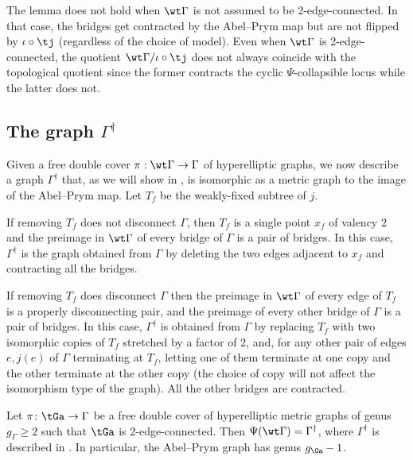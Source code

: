 \begin{rema}
The lemma does not hold when $\wt\Gamma$ is not assumed to be 2-edge-connected. In that case, the bridges get contracted by the Abel--Prym map but are not flipped by $\iota\circ\tj$ (regardless of the choice of model).  
Even when $\wt\Gamma$ is 2-edge-connected, the quotient $\wt\Gamma/\iota\circ\tj$ does not always coincide with the topological quotient since the former contracts the cyclic $\Psi$-collapsible locus while the latter does not. 
\end{rema}

\subsection{The graph \texorpdfstring{$\Gamma^{\dagger}$}{Gamma\textdagger}}\label{GammaDagger}
Given a free double cover $\pi:\wt\Gamma\to\Gamma$ of hyperelliptic graphs, we now describe a graph $\Gamma^{\dagger}$ that, as we will show in , is isomorphic as a metric graph to the image of the Abel--Prym map. 
Let $T_f$ be the weakly-fixed subtree of $j$. 

If removing $T_f$ does not disconnect $\Gamma$, then $T_f$ is a single point $x_f$ of valency 2 and the preimage in $\wt\Gamma$ of every bridge of $\Gamma$ is a pair of bridges.
In this case,   $\Gamma^{\dagger}$ is the graph obtained from $\Gamma$ by deleting the two edges adjacent to $x_f$ and contracting all the bridges. 

If removing $T_f$ does disconnect $\Gamma$ then the preimage in $\wt\Gamma$ of every edge of $T_f$ is a properly disconnecting pair, and the preimage of every other bridge of $\Gamma$ is a pair of bridges. In this case, 
$\Gamma^{\dagger}$ is obtained from $\Gamma$ by replacing $T_f$ with two isomorphic copies of $T_f$ stretched by a factor of 2, and, for any other pair of edges $e,j(e)$ of $\Gamma$ terminating at $T_f$, letting one of them terminate at one copy and the other terminate at the other copy (the choice of copy will not affect the isomorphism type of the graph). All the other bridges are contracted. 
 
\begin{prop} \label{structureOfImage}
 Let $\pi\colon \tGa\to \Gamma$ be a free double cover of hyperelliptic metric graphs of genus $g_{\Gamma}\geq 2$ such that $\tGa$ is 2-edge-connected. Then $\Psi(\wt\Gamma) = \Gamma^{\dagger}$, where $\Gamma^{\dagger}$ is described in .
In particular, the Abel--Prym graph has genus $g_{\Ga}-1$.
\end{prop}

